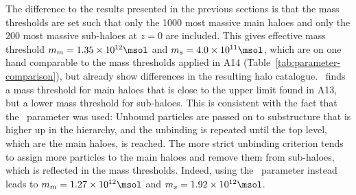 The difference to the results presented in the previous sections is that the mass thresholds are
set such that only the 1000 most massive main haloes and only the 200 most massive sub-haloes at $z = 0$ are included. This gives effective mass threshold $m_{m} = 1.35 \times 10^{12} \msol$ and
$m_{s} = 4.0 \times 10^{11}\msol$, which are on one hand comparable to the mass thresholds applied
in A14 (Table~\ref{tab:parameter-comparison}), but already show differences in the resulting halo
catalogue. \phew\ finds a mass threshold for main haloes that is close to the upper limit found in
A13, but a lower mass threshold for sub-haloes. This is consistent with the fact that the \sad\
parameter was used: Unbound particles are passed on to substructure that is higher up in the
hierarchy, and the unbinding is repeated until the top level, which are the main haloes, is reached.
The more strict unbinding criterion tends to assign more particles to the main haloes and remove
them from sub-haloes, which is reflected in the mass thresholds. Indeed, using the \nosad\ parameter
instead leads to $m_m = 1.27 \times 10^{12}\msol$ and $m_s = 1.92 \times 10^{12}\msol$.



